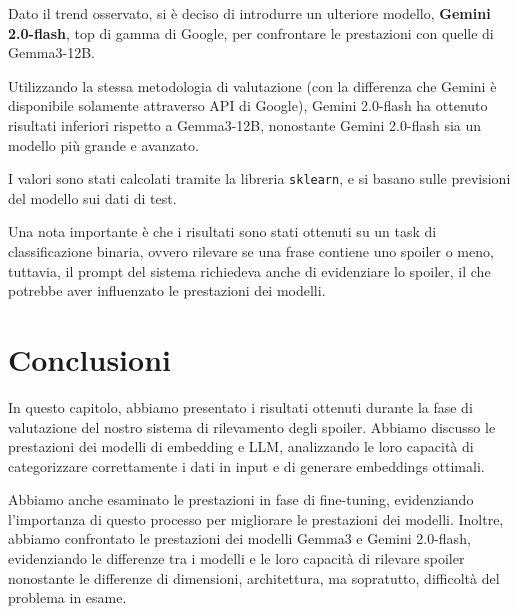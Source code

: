 Dato il trend osservato, si è deciso di introdurre un
ulteriore modello, \textbf{Gemini 2.0-flash}, top di gamma
di Google, per confrontare le prestazioni con quelle di
Gemma3-12B.

Utilizzando la stessa metodologia di valutazione (con la
differenza che Gemini è disponibile solamente attraverso
API di Google), Gemini 2.0-flash ha ottenuto risultati
inferiori rispetto a Gemma3-12B, nonostante Gemini
2.0-flash sia un modello più grande e avanzato.

I valori sono stati calcolati tramite la libreria
\texttt{sklearn}, e si basano sulle previsioni del modello
sui dati di test.

Una nota importante è che i risultati sono stati ottenuti
su un task di classificazione binaria, ovvero rilevare se
una frase contiene uno spoiler o meno, tuttavia, il prompt
del sistema richiedeva anche di evidenziare lo spoiler, il
che potrebbe aver influenzato le prestazioni dei modelli.

\section{Conclusioni}
\label{sec:conclusioni}

In questo capitolo, abbiamo presentato i risultati ottenuti
durante la fase di valutazione del nostro sistema di
rilevamento degli spoiler.
Abbiamo discusso le prestazioni dei modelli di embedding e
LLM, analizzando le loro capacità di categorizzare
correttamente i dati in input e di generare embeddings
ottimali.

Abbiamo anche esaminato le prestazioni in fase di
fine-tuning, evidenziando l'importanza di questo processo
per migliorare le prestazioni dei modelli.
Inoltre, abbiamo confrontato le prestazioni dei modelli
Gemma3 e Gemini 2.0-flash, evidenziando le differenze tra i
modelli e le loro capacità di rilevare spoiler nonostante
le differenze di dimensioni, architettura, ma sopratutto,
difficoltà del problema in esame.
